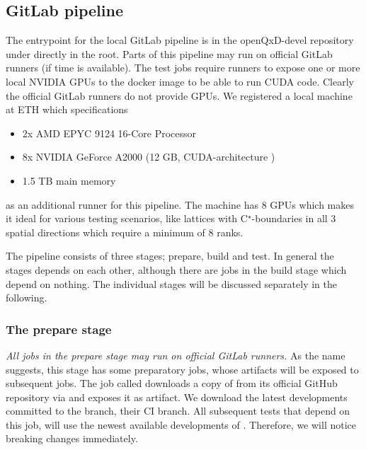\subsection{GitLab pipeline}
\label{sec:cicd:pipeline:gitlab}

The entrypoint for the local GitLab pipeline is in the openQxD-devel repository\cite{gitlab:openqxd-devel} under  directly in the root.
Parts of this pipeline may run on official GitLab runners (if time is available).
The test jobs require runners to expose one or more local NVIDIA GPUs to the docker image to be able to run CUDA code.
Clearly the official GitLab runners do not provide GPUs.
We registered a local machine at ETH which specifications
\begin{itemize}
    \item 2x AMD EPYC 9124 16-Core Processor
    \item 8x NVIDIA GeForce A2000 (12 GB, CUDA-architecture )
    \item 1.5 TB main memory
\end{itemize}
as an additional runner for this pipeline. The machine has 8 GPUs which makes it ideal for various testing scenarios, like lattices with C$^\star$-boundaries in all $3$ spatial directions which require a minimum of 8 ranks.

The pipeline consists of three stages; prepare, build and test.
In general the stages depends on each other, although there are jobs in the build stage which depend on nothing.
The individual stages will be discussed separately in the following.

\subsubsection{The prepare stage}

\emph{All jobs in the prepare stage may run on official GitLab runners.}
As the name suggests, this stage has some preparatory jobs, whose artifacts will be exposed to subsequent jobs.
The job called  downloads a copy of \quda from its official GitHub repository \cite{github:quda} via  and exposes it as artifact.
We download the latest developments committed to the  branch, \ie their CI branch.
All subsequent tests that depend on this job, will use the newest available developments of \quda.
Therefore, we will notice breaking changes immediately.

